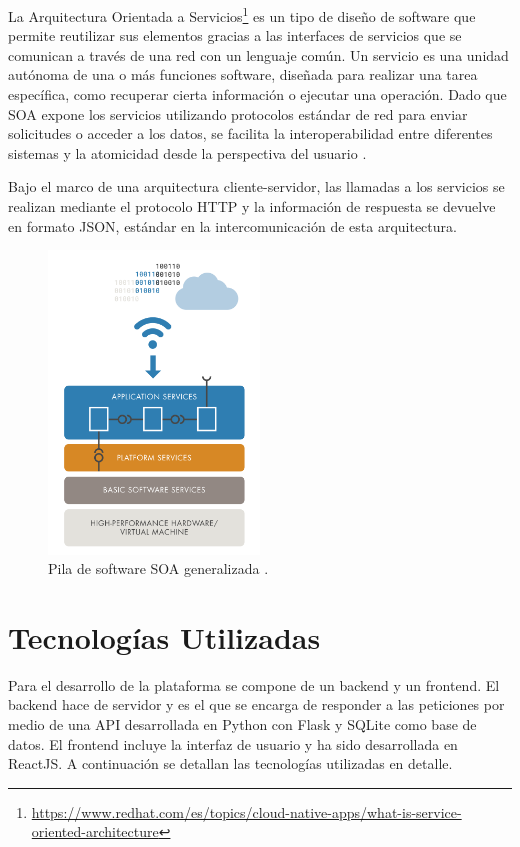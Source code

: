 La Arquitectura Orientada a Servicios\footnote{\url{https://www.redhat.com/es/topics/cloud-native-apps/what-is-service-oriented-architecture}} es un tipo de diseño de software que permite reutilizar sus elementos gracias a las interfaces de servicios que se comunican a través de una red con un lenguaje común. Un servicio es una unidad autónoma de una o más funciones software, diseñada para realizar una tarea específica, como recuperar cierta información o ejecutar una operación. Dado que SOA expone los servicios utilizando protocolos estándar de red para enviar solicitudes o acceder a los datos, se facilita la interoperabilidad entre diferentes sistemas y la atomicidad desde la perspectiva del usuario \cite{laskey2009service, 1210138}.\newline

Bajo el marco de una arquitectura cliente-servidor, las llamadas a los servicios se realizan mediante el protocolo HTTP y la información de respuesta se devuelve en formato JSON, estándar en la intercomunicación de esta arquitectura.\newline

\begin{figure}
    \centering
    \includegraphics[width=0.5\textwidth]{./imagenes/SOA.png}
    \caption{Pila de software SOA generalizada \cite{soa}.}
\end{figure}

\section{Tecnologías Utilizadas}

Para el desarrollo de la plataforma se compone de un backend y un frontend. El backend hace de servidor y es el que se encarga de responder a las peticiones por medio de una API desarrollada en Python con Flask y SQLite como base de datos. El frontend incluye la interfaz de usuario y ha sido desarrollada en ReactJS. A continuación se detallan las tecnologías utilizadas en detalle.

